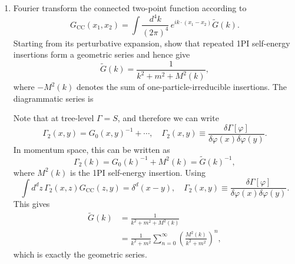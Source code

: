 \begin{enumerate}[label=\alph*)]
    \item Fourier transform the connected two-point function according to
    \begin{equation}
        G_{\mathrm{CC}}(x_1,x_2)
        =\int\frac{d^4k}{(2\pi)^4}\,
        e^{ik\cdot(x_1-x_2)}\widetilde G(k).
    \end{equation}
    Starting from its perturbative expansion, show that repeated 1PI self-energy
    insertions form a geometric series and hence give
    \begin{equation}
        \widetilde G(k)=\frac{1}{k^2+m^2+M^2(k)},
    \end{equation}
    where $-M^2(k)$ denotes the sum of one-particle-irreducible insertions. The
    diagrammatic series is
    \begin{center}
    \end{center}
    \begin{solution}
        Note that at tree-level $\Gamma = S$, and therefore we can write
        \begin{equation}
            \Gamma_2(x,y) = G_0(x,y)^{-1} + \cdots, \quad \Gamma_2(x,y) \equiv \frac{\delta \Gamma[\varphi]}{\delta \varphi(x) \delta\varphi(y)}.
        \end{equation}
        In momentum space, this can be written as
        \begin{equation}
            \Gamma_2(k) = G_0(k)^{-1} +M^2(k) = \tilde{G}(k)^{-1},
        \end{equation}
        where $M^2(k)$ is the 1PI self-energy insertion.
        Using
        \begin{equation}
            \int d^dz\, \Gamma_2(x,z)G_\mathrm{CC}(z,y) = \delta^d (x-y), \quad \Gamma_2(x,y) \equiv \frac{\delta \Gamma[\varphi]}{\delta \varphi(x) \delta\varphi(y)}.
        \end{equation}
        This gives
        \begin{equation}
        \begin{aligned}
            \tilde{G}(k) &= \frac{1}{k^2 + m^2 +M^2(k)}\\
            &=\frac{1}{k^2+m^2}\sum_{n=0}^\infty\left(\frac{M^2(k)}{k^2+m^2}\right)^n,
        \end{aligned}
        \end{equation}
        which is exactly the geometric series.
    \end{solution}
\end{enumerate}
